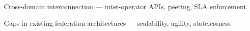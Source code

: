 Cross-domain interconnection — inter-operator APIs, peering, SLA enforcement

Gaps in existing federation architectures — scalability, agility, statelessness



